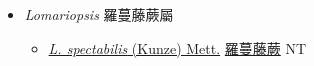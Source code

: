 
  \begin{itemize}
 \item[] \textit{Lomariopsis} 羅蔓藤蕨屬
                    
  \begin{itemize}
        \item[] \href{http://www.theplantlist.org/tpl1.1/search?q=Lomariopsis+spectabilis}{\textit{L. spectabilis} (Kunze) Mett.}   \href{\detokenize{http://taibnet.sinica.edu.tw/chi/taibnet_species_list.php?T2=羅蔓藤蕨&T2_new_value=true&fr=y}}{羅蔓藤蕨} NT
  \end{itemize}
  \end{itemize}
